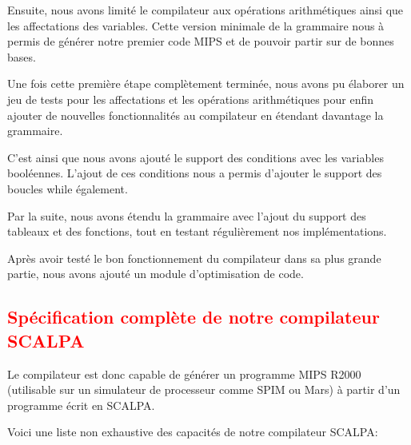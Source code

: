 \documentclass[a4paper]{article}
\newcommand{\csection}[1]{\textcolor{red}{\section{#1}}}
\begin{document}
Ensuite, nous avons limité le compilateur aux opérations arithmétiques ainsi que les affectations des variables. Cette version minimale de la grammaire nous à permis de générer notre premier code MIPS et de pouvoir partir sur de bonnes bases.

Une fois cette première étape complètement terminée, nous avons pu élaborer un jeu de tests pour les affectations et les opérations arithmétiques pour enfin ajouter de nouvelles fonctionnalités au compilateur en étendant davantage la grammaire.

C'est ainsi que nous avons ajouté le support des conditions avec les variables booléennes. L'ajout de ces conditions nous a permis d'ajouter le support des boucles while également.

Par la suite, nous avons étendu la grammaire avec l'ajout du support des tableaux et des fonctions, tout en testant régulièrement nos implémentations.

Après avoir testé le bon fonctionnement du compilateur dans sa plus grande partie, nous avons ajouté un module d'optimisation de code.

\clearpage

\csection{Spécification complète de notre compilateur SCALPA}

Le compilateur est donc capable de générer un programme MIPS R2000 (utilisable sur un simulateur de processeur comme SPIM ou Mars) à partir d'un programme écrit en SCALPA.

Voici une liste non exhaustive des capacités de notre compilateur SCALPA:
\end{document}
